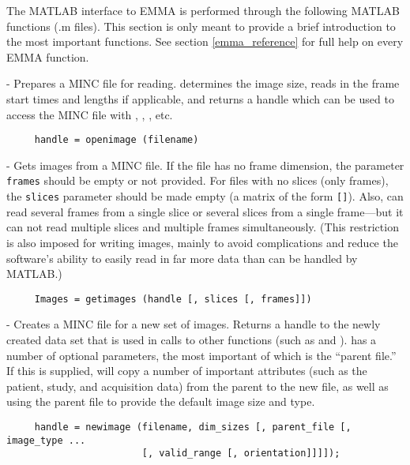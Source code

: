 The MATLAB interface to EMMA is performed through the following MATLAB
functions (.m files).  This section is only meant to provide a brief
introduction to the most important functions.  See section
\ref{emma_reference} for full help on every EMMA function.

\begin{description}

\item {} - Prepares a MINC file for reading.
 determines the image size, reads in the frame start
times and lengths if applicable, and returns a handle which can be
used to access the MINC file with ,
, , etc.
\begin{verbatim}
     handle = openimage (filename)
\end{verbatim}

\item {} - Gets images from a MINC file.  If the file
has no frame dimension, the parameter \verb|frames| should be empty
or not provided.  For files with no slices (only frames), the
\verb|slices| parameter should be made empty (a matrix of the form
\verb|[]|).  Also,  can read several frames from a
single slice or several slices from a single frame---but it can not
read multiple slices and multiple frames simultaneously.  (This
restriction is also imposed for writing images, mainly to avoid
complications and reduce the software's ability to easily read in far
more data than can be handled by MATLAB.)
\begin{verbatim}
     Images = getimages (handle [, slices [, frames]])
\end{verbatim}

\item {} - Creates a MINC file for a new set of images.
Returns a handle to the newly created data set that is used in calls
to other functions (such as  and ).
 has a number of optional parameters, the most
important of which is the ``parent file.''  If this is supplied,
 will copy a number of important attributes (such as
the patient, study, and acquisition data) from the parent to the new
file, as well as using the parent file to provide the default image
size and type.
\begin{verbatim}
     handle = newimage (filename, dim_sizes [, parent_file [, image_type ...
                        [, valid_range [, orientation]]]]);
\end{verbatim}


\end{description}
